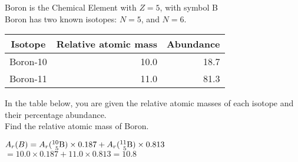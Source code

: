 \begin{example}
Boron is the Chemical Element with $Z = 5$, with symbol B \\
Boron has two known isotopes: $N = 5$, and $N = 6$. \\


\begin{table}[h] 
\centering
\begin{tabular}{crr} 
\hline
Isotope & Relative atomic mass & Abundance\\
\hline 
Boron-10 & 10.0 & 18.7\\ 
Boron-11 & 11.0 & 81.3\\ 
\hline 
\end{tabular} 
\end{table} 



In the table below, you are given the relative atomic masses of each isotope and their percentage abundance. \\
Find the relative atomic mass of Boron.

$A_r(B) = A_r(\nucl{10}{5}{B}) \times 0.187 + A_r(\nucl{11}{5}{B}) \times 0.813$\\
$= 10.0 \times 0.187 + 11.0 \times 0.813 = 10.8$

\frmrule


\end{example}